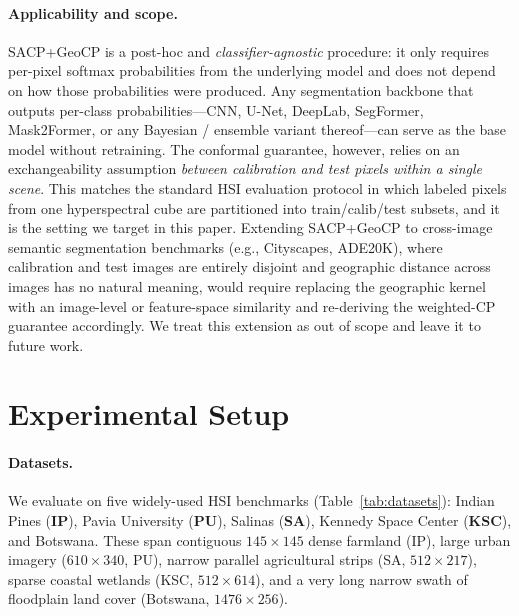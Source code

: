 \documentclass[11pt]{article}
\newcommand{\1}{\mathbf{1}}
\begin{document}
\paragraph{Applicability and scope.} SACP+GeoCP is a post-hoc and \emph{classifier-agnostic} procedure: it only requires per-pixel softmax probabilities from the underlying model and does not depend on how those probabilities were produced. Any segmentation backbone that outputs per-class probabilities---CNN, U-Net, DeepLab, SegFormer, Mask2Former, or any Bayesian / ensemble variant thereof---can serve as the base model without retraining. The conformal guarantee, however, relies on an exchangeability assumption \emph{between calibration and test pixels within a single scene}. This matches the standard HSI evaluation protocol in which labeled pixels from one hyperspectral cube are partitioned into train/calib/test subsets, and it is the setting we target in this paper. Extending SACP+GeoCP to cross-image semantic segmentation benchmarks (e.g., Cityscapes, ADE20K), where calibration and test images are entirely disjoint and geographic distance across images has no natural meaning, would require replacing the geographic kernel with an image-level or feature-space similarity and re-deriving the weighted-CP guarantee accordingly. We treat this extension as out of scope and leave it to future work.

\section{Experimental Setup}

\paragraph{Datasets.} We evaluate on five widely-used HSI benchmarks (Table~\ref{tab:datasets}): Indian Pines (\textbf{IP}), Pavia University (\textbf{PU}), Salinas (\textbf{SA}), Kennedy Space Center (\textbf{KSC}), and Botswana. These span contiguous $145\times145$ dense farmland (IP), large urban imagery ($610 \times 340$, PU), narrow parallel agricultural strips (SA, $512 \times 217$), sparse coastal wetlands (KSC, $512 \times 614$), and a very long narrow swath of floodplain land cover (Botswana, $1476 \times 256$).
\end{document}
